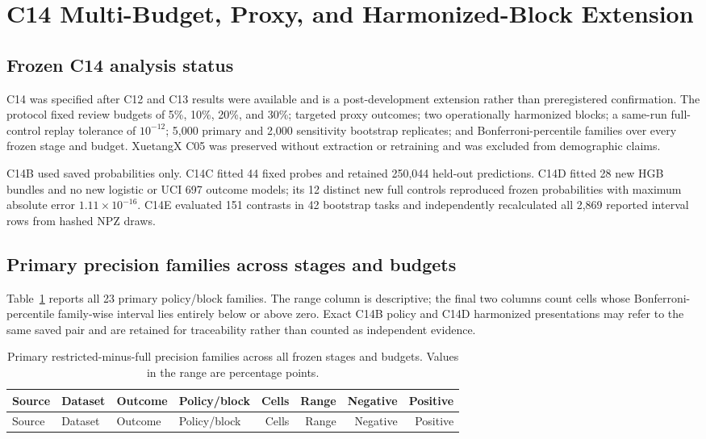 \section{C14 Multi-Budget, Proxy, and Harmonized-Block Extension}

\subsection{Frozen C14 analysis status}

C14 was specified after C12 and C13 results were available and is a post-development extension rather than preregistered confirmation. The protocol fixed review budgets of 5\%, 10\%, 20\%, and 30\%; targeted proxy outcomes; two operationally harmonized blocks; a same-run full-control replay tolerance of $10^{-12}$; 5,000 primary and 2,000 sensitivity bootstrap replicates; and Bonferroni-percentile families over every frozen stage and budget. XuetangX C05 was preserved without extraction or retraining and was excluded from demographic claims.

C14B used saved probabilities only. C14C fitted 44 fixed probes and retained 250,044 held-out predictions. C14D fitted 28 new HGB bundles and no new logistic or UCI 697 outcome models; its 12 distinct new full controls reproduced frozen probabilities with maximum absolute error $1.11\times10^{-16}$. C14E evaluated 151 contrasts in 42 bootstrap tasks and independently recalculated all 2,869 reported interval rows from hashed NPZ draws.

\subsection{Primary precision families across stages and budgets}

Table~\ref{tab:s_c14families} reports all 23 primary policy/block families. The range column is descriptive; the final two columns count cells whose Bonferroni-percentile family-wise interval lies entirely below or above zero. Exact C14B policy and C14D harmonized presentations may refer to the same saved pair and are retained for traceability rather than counted as independent evidence.

\scriptsize
\setlength{\tabcolsep}{2pt}
\begin{longtable}{p{}p{}p{}p{}rrrr}
\caption{Primary restricted-minus-full precision families across all frozen stages and budgets. Values in the range are percentage points.}\label{tab:s_c14families}\\
\toprule
Source & Dataset & Outcome & Policy/block & Cells & Range & Negative & Positive \\
\midrule
\endfirsthead
\toprule
Source & Dataset & Outcome & Policy/block & Cells & Range & Negative & Positive \\
\midrule
\endhead

\end{longtable}
\setlength{\tabcolsep}{6pt}
\normalsize

